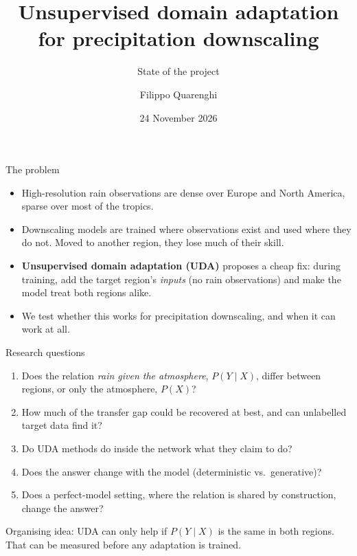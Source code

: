 \documentclass[11pt,aspectratio=169,xcolor=table]{beamer}
\title{Unsupervised domain adaptation\\for precipitation downscaling}
\subtitle{State of the project}
\author{Filippo Quarenghi}
\date{24 November 2026}
\newcommand{\take}[1]{\vfill\begin{block}{}#1\end{block}}
\begin{document}
\begin{frame}[plain]
\titlepage
\end{frame}

\begin{frame}{The problem}
\begin{itemize}
  \item High-resolution rain observations are dense over Europe and North
        America, sparse over most of the tropics.
  \item Downscaling models are trained where observations exist and used
        where they do not. Moved to another region, they lose much of their
        skill.
  \item \textbf{Unsupervised domain adaptation (UDA)} proposes a cheap fix:
        during training, add the target region's \emph{inputs} (no rain
        observations) and make the model treat both regions alike.
  \item We test whether this works for precipitation downscaling, and when
        it can work at all.
\end{itemize}
\end{frame}

\begin{frame}{Research questions}
\begin{enumerate}
  \item Does the relation \emph{rain given the atmosphere}, $P(Y\mid X)$,
        differ between regions, or only the atmosphere, $P(X)$?
  \item How much of the transfer gap could be recovered at best, and can
        unlabelled target data find it?
  \item Do UDA methods do inside the network what they claim to do?
  \item Does the answer change with the model (deterministic vs.\
        generative)?
  \item Does a perfect-model setting, where the relation is shared by
        construction, change the answer?
\end{enumerate}
\take{Organising idea: UDA can only help if $P(Y\mid X)$ is the same in both
regions. That can be measured before any adaptation is trained.}
\end{frame}
\end{document}
